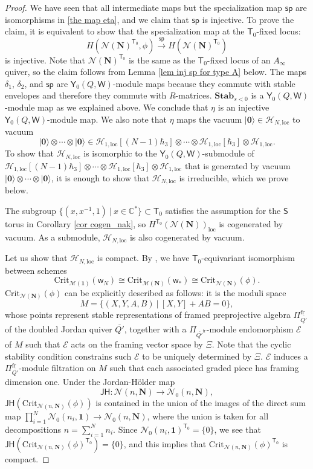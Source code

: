 \documentclass[10pt]{amsart}
\theoremstyle{definition}
\numberwithin{equation}{section}
\newcommand{\Crit}{\mathrm{Crit}}
\newcommand{\bC}{\mathbb{C}}
\newcommand{\cE}{\mathcal{E}}
\newcommand{\cH}{\mathcal{H}}
\newcommand{\cM}{\mathcal{M}}
\newcommand{\cN}{\mathcal{N}}
\newcommand{\loc}{\mathrm{loc}}
\newcommand{\sT}{\mathsf{T}}
\newcommand{\sW}{\mathsf{W}}
\newcommand{\sw}{\mathsf{w}}
\begin{document}
\begin{proof}
We have seen that all intermediate maps but the specialization map $\mathsf{sp}$ are isomorphisms in \eqref{the map eta}, and we claim that $\mathsf{sp}$ is injective. To prove the claim, it is equivalent to show that the specialization map at the $\sT_0$-fixed locus:
$$H(\cN(\mathbf N)^{\sT_0},\phi)\xrightarrow{\mathsf{sp}} H(\cN(\mathbf N)^{\sT_0})$$ 
is injective. Note that $\cN(\mathbf N)^{\sT_0}$ is the same as the $\sT_0$-fixed locus of an $A_{\infty}$ quiver, so the claim follows from Lemma \ref{lem inj sp for type A} below. 
The maps $\delta_1$, $\delta_2$, and $\mathsf{sp}$ are $\mathsf Y_{0}(Q,\sW)$-module maps because they commute with stable envelopes and therefore they commute with $R$-matrices. $\mathbf{Stab}_{s<0}$ is a $\mathsf Y_{0}(Q,\sW)$-module map as we explained above. We conclude that $\eta$ is an injective $\mathsf Y_{0}(Q,\sW)$-module map. We also note that $\eta$ maps the vacuum $|\mathbf 0\rangle\in \cH_{N,\loc}$ to vacuum 
$$|\mathbf 0\rangle\otimes\cdots\otimes |\mathbf 0\rangle\in \cH_{1,\loc}[(N-1)\hbar_3]\otimes\cdots\otimes \cH_{1,\loc}[\hbar_3]\otimes \cH_{1,\loc}. $$ 
To show that $\cH_{N,\loc}$ is isomorphic to the $\mathsf Y_{0}(Q,\sW)$-submodule of $\cH_{1,\loc}[(N-1)\hbar_3]\otimes\cdots\otimes \cH_{1,\loc}[\hbar_3]\otimes \cH_{1,\loc}$ that is generated by vacuum $|\mathbf 0\rangle\otimes\cdots\otimes |\mathbf 0\rangle$, it is enough to show that $\cH_{N,\loc}$ is irreducible, which we prove below.

The subgroup $\{(x,x^{-1},1)\:|\: x\in \bC^*\}\subset \sT_0$ satisfies the assumption for the $\mathsf S$ torus in Corollary \ref{cor cogen_nak}, so $H^{\sT_0}(\cN(\mathbf N))_\loc$ is cogenerated by vacuum. As a submodule, $\cH_{N,\loc}$ is also cogenerated by vacuum. 

Let us show that $\cH_{N,\loc}$ is compact. By \cite[Prop.~6.5]{COZZ}, we have $\sT_0$-equivariant isomorphism between schemes 
$$\Crit_{\cM(\mathbf 1)}(\sw_N)\cong \Crit_{\cM(\mathbf N)}(\sw_*)\cong \Crit_{\cN(\mathbf N)}(\phi). $$ 
$\Crit_{\cN(\mathbf N)}(\phi)$ can be explicitly described as follows: it is the moduli space 
$$M=\{(X,Y,A,B)\:|\:[X,Y]+AB=0\}, $$ 
whose points represent stable representations of framed preprojective algebra $\Pi_{\overline{Q'}}^{\mathrm{fr}}$ of the doubled Jordan quiver $\overline{Q'}$, together with a $\Pi_{\overline{Q'}^{\mathrm{fr}}}$-module endomorphism $\cE$ of $M$ such that $\mathcal E$ acts on the framing vector space by $\Xi$. Note that the cyclic stability condition constrains such $\cE$ to be uniquely determined by $\Xi$. $\mathcal E$ induces a $\Pi_{\overline{Q'}}^{\mathrm{fr}}$-module filtration on $M$ such that each associated graded piece has framing dimension one. Under the Jordan-H\"older map 
$$\mathsf{JH}\colon \cN(n,\mathbf N)\to \cN_0(n,\mathbf N), $$ 
$\mathsf{JH}(\Crit_{\cN(n,\mathbf N)}(\phi))$ is contained in the union of the images of the direct sum map $\prod_{i=1}^N\cN_0(n_i,\mathbf 1)\to \cN_0(n,\mathbf N)$, 
where the union is taken for all decompositions $n=\sum_{i=1}^Nn_i$. Since $\cN_0(n_i,\mathbf 1)^{\sT_0}=\{0\}$, we see that $\mathsf{JH}(\Crit_{\cN(n,\mathbf N)}(\phi)^{\sT_0})=\{0\}$, and this implies that $\Crit_{\cN(n,\mathbf N)}(\phi)^{\sT_0}$ is compact.


\end{proof}
\end{document}

